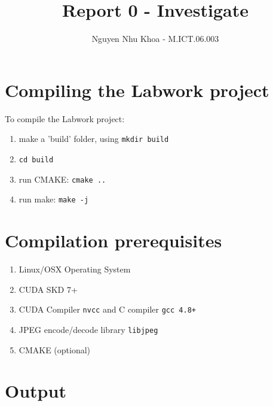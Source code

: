 \documentclass[a4paper,11pt, notitlepage]{article}
\begin{document}
\title{
\vspace{-3cm}
Report 0 - Investigate}
\author{Nguyen Nhu Khoa - M.ICT.06.003}
\maketitle

\pagestyle{plain}
\setcounter{page}{1}

\vspace{-1cm}
\noindent

\section{Compiling the Labwork project}

To compile the Labwork project:

\begin{enumerate}
	\item make a 'build' folder, using \verb|mkdir build|
	\item \verb|cd build|
	\item run CMAKE: \verb|cmake ..|
	\item run make: \verb|make -j|
\end{enumerate}

\section{Compilation prerequisites}

\begin{enumerate}
	\item Linux/OSX Operating System
	\item CUDA SKD 7+
	\item CUDA Compiler \verb|nvcc| and C compiler \verb|gcc 4.8+|
	\item JPEG encode/decode library \verb|libjpeg|
	\item CMAKE (optional)
\end{enumerate}

\section{Output}
\end{document}
